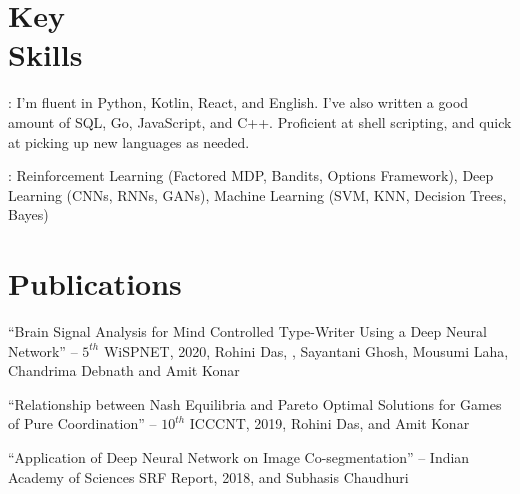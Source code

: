 \documentclass[mm]{simple_style}
\begin{document}
\begin{resume}
\vspace{-2ex}
\sectionline


\section{Key\\Skills}
: I’m fluent in Python, Kotlin, React, and English. I’ve also written a good amount of SQL, Go, JavaScript, and C++. Proficient at shell scripting, and quick at picking up new languages as needed.
\\

\vspace{-4ex}

: Reinforcement Learning (Factored MDP, Bandits, Options Framework), Deep Learning (CNNs, RNNs, GANs), Machine Learning (SVM, KNN, Decision Trees, Bayes)

\vspace{-2ex}
\sectionline


\newpage
\sectionline

\section{Publications}
``Brain Signal Analysis for Mind Controlled Type-Writer Using a Deep Neural Network'' -- $5^{th}$ WiSPNET, 2020, Rohini Das, , Sayantani Ghosh, Mousumi Laha, Chandrima Debnath and Amit Konar\\

\vspace{-4ex}

``Relationship between Nash Equilibria and Pareto Optimal Solutions for Games of Pure Coordination'' -- $10^{th}$ ICCCNT, 2019, Rohini Das,  and Amit Konar\\

\vspace{-4ex}

``Application of Deep Neural Network on Image Co-segmentation'' -- Indian Academy of Sciences SRF Report, 2018,  and Subhasis Chaudhuri


\end{resume}
\end{document}

